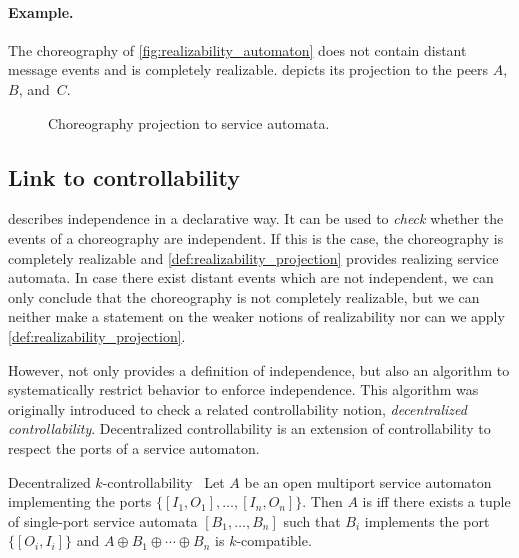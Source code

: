 \paragraph{Example.}

The choreography of \autoref{fig:realizability_automaton}  does not contain distant message events and is completely realizable.  depicts its projection to the peers $A$, $B$, and~$C$.

\begin{figure}
\centering
{}\hfill
{}\hfill
{}
\caption{Choreography projection to service automata.}\label{fig:real:project}
\end{figure}




\subsection*{Link to controllability}

 describes independence in a declarative way. It can be used to \emph{check} whether the events of a choreography are independent. If this is the case, the choreography is completely realizable and \autoref{def:realizability_projection} provides realizing service automata. In case there exist distant events which are not independent, we can only conclude that the choreography is not completely realizable, but we can neither make a statement on the weaker notions of realizability nor can we apply \autoref{def:realizability_projection}.

However, \citet{Wolf_2008_topnoc} not only provides a definition of independence, but also an algorithm to systematically restrict behavior to enforce independence. This algorithm was originally introduced to check a related controllability notion, \emph{decentralized controllability}. Decentralized controllability is an extension of controllability to respect the ports of a service automaton.

\begin{definition}{Decentralized \boldmath$k$-controllability~\cite{Schmidt_2005_emisa,Wolf_2008_topnoc}}%
Let $A$ be an open multiport service automaton implementing the ports $\{[I_{1},O_{1}],\ldots,[I_{n},O_{n}]\}$. Then $A$ is  iff there exists a tuple of single-port service automata $[B_{1},\ldots,B_{n}]$ such that $B_{i}$ implements the port $\{[O_{i},I_{i}]\}$ and $A\oplus B_{1}\oplus\cdots\oplus B_{n}$ is $k$-compatible.
\end{definition}

